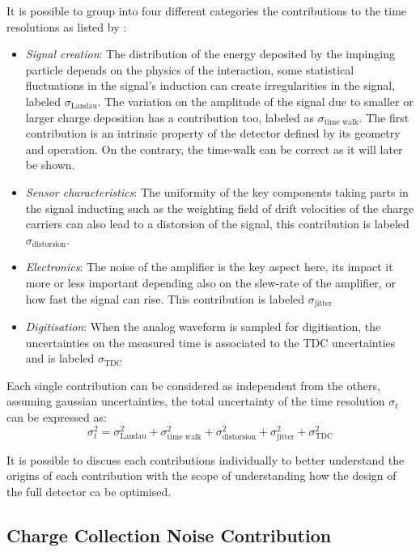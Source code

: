 	It is possible to group into four different categories the contributions to the time resolutions as listed by \cite{timeres_SiliconDetectors}:
	\begin{itemize}
		\item \textit{Signal creation}: The distribution of the energy deposited by the impinging particle depends on the physics of the interaction, some statistical fluctuations in the signal's induction can create irregularities in the signal, labeled $\sigma_{\text{Landau}}$. The variation on the amplitude of the signal due to smaller or larger charge deposition has a contribution too, labeled as $\sigma_{\text{time walk}}$. The first contribution is an intrinsic property of the detector defined by its geometry and operation. On the contrary, the time-walk can be correct as it will later be shown.
		\item \textit{Sensor characteristics}: The uniformity of the key components taking parts in the signal inducting such as the weighting field of drift velocities of the charge carriers can also lead to a distorsion of the signal, this contribution is labeled $\sigma_{\text{distorsion}}$.
		\item \textit{Electronics}: The noise of the amplifier is the key aspect here, its impact it more or less important depending also on the slew-rate of the amplifier, or how fast the signal can rise. This contribution is labeled $\sigma_{\text{jitter}}$
		\item \textit{Digitisation}: When the analog waveform is sampled for digitisation, the uncertainties on the measured time is associated to the TDC uncertainties and is labeled $\sigma_{\text{TDC}}$
	\end{itemize} 
	
	Each single contribution can be considered as independent from the others, assuming gaussian uncertainties, the total uncertainty of the time resolution $\sigma_t$ can be expressed as: 
	\begin{equation}
		\sigma_t^2 = \sigma_{\text{Landau}}^2 + \sigma_{\text{time walk}}^2 + \sigma_{\text{distorsion}}^2 + \sigma_{\text{jitter}}^2 + \sigma_{\text{TDC}}^2
	\end{equation}
	
	It is possible to discuss each contributions individually to better understand the origins of each contribution with the scope of understanding how the design of the full detector ca be optimised. 
	
	 	\subsection{Charge Collection Noise Contribution}


